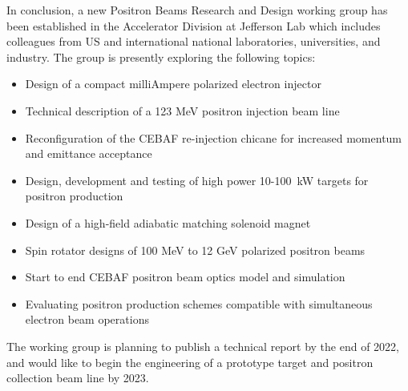 In conclusion, a new Positron Beams Research and Design working group has been established in the Accelerator Division at Jefferson Lab which includes colleagues from US and international national laboratories, universities, and industry.   The group is presently exploring the following topics:

\begin{itemize}
    \item Design of a compact milliAmpere polarized electron injector
    \item Technical description of a 123 MeV positron injection beam line
    \item Reconfiguration of the CEBAF re-injection chicane for increased momentum and emittance acceptance
    \item Design, development and testing of high power 10-100~kW targets for positron production
    \item Design of a high-field adiabatic matching solenoid magnet
    \item Spin rotator designs of 100 MeV to 12 GeV polarized positron beams
    \item Start to end CEBAF positron beam optics model and simulation
    \item Evaluating positron production schemes compatible with simultaneous electron beam operations
\end{itemize}
The working group is planning to publish a technical report by the end of 2022, and would like to begin the engineering of a prototype target and positron collection beam line by 2023.